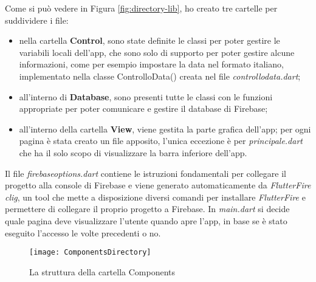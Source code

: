 Come si può vedere in Figura \ref{fig:directory-lib}, ho creato tre cartelle per suddividere i file:
\begin{itemize}
    \item nella cartella \textbf{Control}, sono state definite le classi per poter gestire le variabili locali dell'app, che sono solo di supporto per poter gestire alcune informazioni, come per esempio impostare la data nel formato italiano, implementato nella classe ControlloData() creata nel file \emph{controllo\textunderscore  data.dart};
    \item all'interno di \textbf{Database}, sono presenti tutte le classi con le funzioni appropriate per poter comunicare e gestire il database di Firebase;
    \item all'interno della cartella \textbf{View}, viene gestita la parte grafica dell'app; per ogni pagina è stata creato un file apposito, l'unica eccezione è per \emph{principale.dart} che ha il solo scopo di visualizzare la barra inferiore dell'app.
\end{itemize}
Il file \emph{firebase\textunderscore options.dart} contiene le istruzioni fondamentali per collegare il progetto alla console di Firebase e viene generato automaticamente da \emph{FlutterFire \gls{clig}\glsfirstoccur}, un tool che mette a disposizione diversi comandi per installare \emph{FlutterFire} e permettere di collegare il proprio progetto a Firebase.\newline
In \emph{main.dart} si decide quale pagina deve visualizzare l'utente quando apre l'app, in base se è stato eseguito l'accesso le volte precedenti o no.
\begin{figure}[!h] 
    \centering 
    \texttt{[image: ComponentsDirectory]} 
    \caption{La struttura della cartella Components}
    \label{fig:directory-components}
\end{figure}

